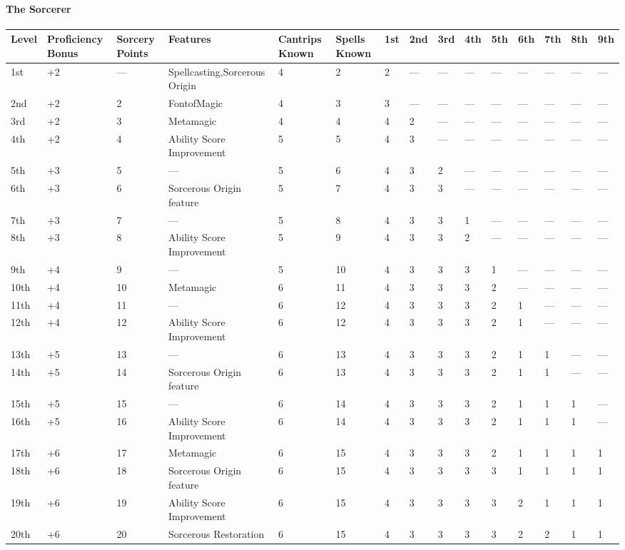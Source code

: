 \documentclass[
]{article}
\begin{document}
\hypertarget{the-sorcerer}{%
\paragraph{The Sorcerer}\label{the-sorcerer}}

\begin{longtable}[]{@{}lllllllllllllll@{}}
\toprule
Level & Proficiency Bonus & Sorcery Points & Features & Cantrips Known &
Spells Known & 1st & 2nd & 3rd & 4th & 5th & 6th & 7th & 8th &
9th\tabularnewline
\midrule
\endhead
1st & +2 & --- & Spellcasting,Sorcerous Origin & 4 & 2 & 2 & --- & --- &
--- & --- & --- & --- & --- & ---\tabularnewline
2nd & +2 & 2 & FontofMagic & 4 & 3 & 3 & --- & --- & --- & --- & --- &
--- & --- & ---\tabularnewline
3rd & +2 & 3 & Metamagic & 4 & 4 & 4 & 2 & --- & --- & --- & --- & --- &
--- & ---\tabularnewline
4th & +2 & 4 & Ability Score Improvement & 5 & 5 & 4 & 3 & --- & --- &
--- & --- & --- & --- & ---\tabularnewline
5th & +3 & 5 & --- & 5 & 6 & 4 & 3 & 2 & --- & --- & --- & --- & --- &
---\tabularnewline
6th & +3 & 6 & Sorcerous Origin feature & 5 & 7 & 4 & 3 & 3 & --- & ---
& --- & --- & --- & ---\tabularnewline
7th & +3 & 7 & --- & 5 & 8 & 4 & 3 & 3 & 1 & --- & --- & --- & --- &
---\tabularnewline
8th & +3 & 8 & Ability Score Improvement & 5 & 9 & 4 & 3 & 3 & 2 & --- &
--- & --- & --- & ---\tabularnewline
9th & +4 & 9 & --- & 5 & 10 & 4 & 3 & 3 & 3 & 1 & --- & --- & --- &
---\tabularnewline
10th & +4 & 10 & Metamagic & 6 & 11 & 4 & 3 & 3 & 3 & 2 & --- & --- &
--- & ---\tabularnewline
11th & +4 & 11 & --- & 6 & 12 & 4 & 3 & 3 & 3 & 2 & 1 & --- & --- &
---\tabularnewline
12th & +4 & 12 & Ability Score Improvement & 6 & 12 & 4 & 3 & 3 & 3 & 2
& 1 & --- & --- & ---\tabularnewline
13th & +5 & 13 & --- & 6 & 13 & 4 & 3 & 3 & 3 & 2 & 1 & 1 & --- &
---\tabularnewline
14th & +5 & 14 & Sorcerous Origin feature & 6 & 13 & 4 & 3 & 3 & 3 & 2 &
1 & 1 & --- & ---\tabularnewline
15th & +5 & 15 & --- & 6 & 14 & 4 & 3 & 3 & 3 & 2 & 1 & 1 & 1 &
---\tabularnewline
16th & +5 & 16 & Ability Score Improvement & 6 & 14 & 4 & 3 & 3 & 3 & 2
& 1 & 1 & 1 & ---\tabularnewline
17th & +6 & 17 & Metamagic & 6 & 15 & 4 & 3 & 3 & 3 & 2 & 1 & 1 & 1 &
1\tabularnewline
18th & +6 & 18 & Sorcerous Origin feature & 6 & 15 & 4 & 3 & 3 & 3 & 3 &
1 & 1 & 1 & 1\tabularnewline
19th & +6 & 19 & Ability Score Improvement & 6 & 15 & 4 & 3 & 3 & 3 & 3
& 2 & 1 & 1 & 1\tabularnewline
20th & +6 & 20 & Sorcerous Restoration & 6 & 15 & 4 & 3 & 3 & 3 & 3 & 2
& 2 & 1 & 1\tabularnewline
\bottomrule
\end{longtable}
\end{document}
